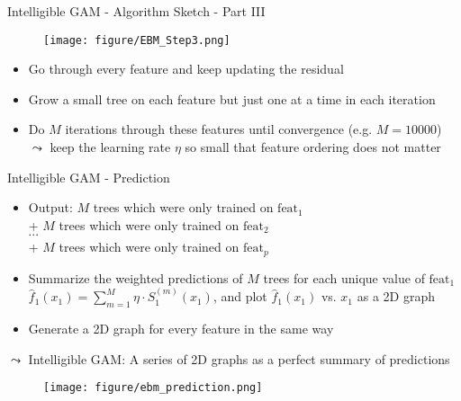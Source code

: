 \documentclass[10pt,compress,t,notes=noshow, xcolor=table]{beamer}
\begin{document}
\begin{frame}{Intelligible GAM - Algorithm Sketch - Part III}
\begin{figure}
    \centering
    \texttt{[image: figure/EBM\_Step3.png]}
    \label{fig:Intelligible EBM_Step3}
\end{figure}
\begin{itemize}
    \item Go through every feature and keep updating the residual
    \item Grow a small tree on each feature but just one at a time in each iteration
    \item Do $M$ iterations through these features until convergence (e.g. $M=10000$) \\
    $\leadsto$ keep the learning rate $\eta$ so small that feature ordering does not matter
\end{itemize}

\end{frame}

\begin{frame}{Intelligible GAM - Prediction}
\begin{itemize}
    \item Output: $M$ trees which were only trained on $\text{feat}_1$ \\
    \qquad\;\; + $M$ trees which were only trained on $\text{feat}_2$ \\
    \qquad\;\; $\cdots$ \\
    \qquad\;\; + $M$ trees which were only trained on $\text{feat}_p$
    \item Summarize the weighted predictions of $M$ trees for each unique value of $\text{feat}_1$ $\hat{f}_1(x_1)=\sum_{m=1}^{M}\eta\cdot S_1^{(m)}(x_1)$, and plot $\hat{f}_1(x_1)$ vs. $x_1$ as a 2D graph
    \item Generate a 2D graph for every feature in the same way
\end{itemize}
\quad $\leadsto$ Intelligible GAM: A series of 2D graphs as a perfect summary of predictions
\begin{figure}
    \centering
    \texttt{[image: figure/ebm\_prediction.png]}
    \label{fig:Intelligible ebm_prediction}
\end{figure}
\end{frame}
\end{document}
